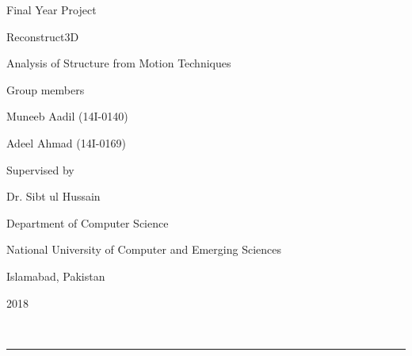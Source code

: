 \documentclass[11pt, a4paper, openany]{article}
\begin{document}
\begin{center}
{\Huge Final Year Project}
\end{center}
\vspace{.2in}
\begin{center}
{\Huge Reconstruct3D}
\end{center}
\vspace{.15in}
\begin{center}
{\huge Analysis of Structure from Motion Techniques}
\end{center}
\vspace{.5in}
\begin{center}
{\Large Group members}
\end{center}
\vspace{.10in}
\begin{center}
{\large Muneeb Aadil (14I-0140)}
\end{center}
\begin{center}
{\large Adeel Ahmad (14I-0169)}
\end{center}
\vspace{.7in}
\begin{center}
{\Large Supervised by}
\end{center}
\vspace{.10in}
\begin{center}
{\large Dr. Sibt ul Hussain}
\end{center}
\vspace{.6in}
\begin{center}
{\large Department of Computer Science}
\end{center}
\vspace{.10in}
\begin{center}
{\large National University of Computer and Emerging Sciences}
\end{center}
\vspace{.10in}
\begin{center}
{\large Islamabad, Pakistan}
\end{center}
\vspace{.10in}
\begin{center}
{\large 2018}
\end{center}
\mbox{} \
\vfill \
\begin{center}
\noindent\rule{14cm}{0.4pt}
\end{center}
\newpage

\pagestyle{fancy}
\fancyhf{}

\fancyhead[R]{\thepage}
\fancyhead[R]{\ifodd\value{page}\fi \thepage}
\end{document}
